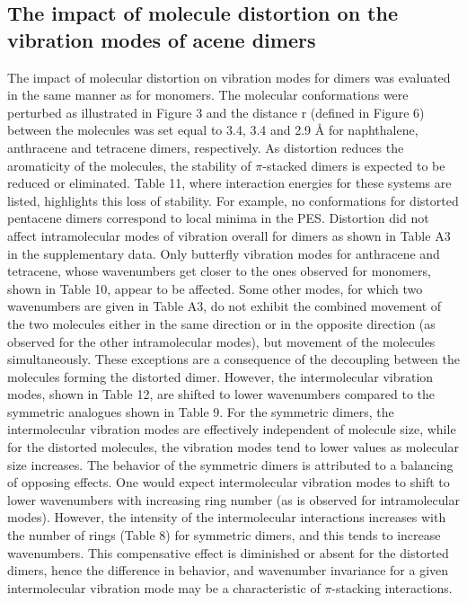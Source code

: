 \subsection{The impact of molecule distortion on the vibration modes of acene dimers}

The impact of molecular distortion on vibration modes for dimers was evaluated in the same manner as for monomers. The molecular conformations were perturbed as illustrated in Figure 3 and the distance r (defined in Figure 6) between the molecules was set equal to 3.4, 3.4 and 2.9 Å for naphthalene, anthracene and tetracene dimers, respectively.  As distortion reduces the aromaticity of the molecules, the stability of $\pi$-stacked dimers is expected to be reduced or eliminated. Table 11, where interaction energies for these systems are listed, highlights this loss of stability. For example, no conformations for distorted pentacene dimers correspond to local minima in the PES. Distortion did not affect intramolecular modes of vibration overall for dimers as shown in Table A3 in the supplementary data. Only butterfly vibration modes for anthracene and tetracene, whose wavenumbers get closer to the ones observed for monomers, shown in Table 10, appear to be affected. Some other modes, for which two wavenumbers are given in Table A3, do not exhibit the combined movement of the two molecules either in the same direction or in the opposite direction (as observed for the other intramolecular modes), but movement of the molecules simultaneously. These exceptions are a consequence of the decoupling between the molecules forming the distorted dimer. However, the intermolecular vibration modes, shown in Table 12, are shifted to lower wavenumbers compared to the symmetric analogues shown in Table 9. For the symmetric dimers, the intermolecular vibration modes are effectively independent of molecule size, while for the distorted molecules, the vibration modes tend to lower values as molecular size increases. 
The behavior of the symmetric dimers is attributed to a balancing of opposing effects. One would expect intermolecular vibration modes to shift to lower wavenumbers with increasing ring number (as is observed for intramolecular modes). However, the intensity of the intermolecular interactions increases with the number of rings (Table 8) for symmetric dimers, and this tends to increase wavenumbers. This compensative effect is diminished or absent for the distorted dimers, hence the difference in behavior, and wavenumber invariance for a given intermolecular vibration mode may be a characteristic of $\pi$-stacking interactions. 

